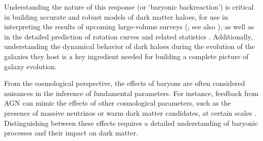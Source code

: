 Understanding the nature of this response (or `baryonic backreaction') is critical in building accurate and robust models of dark matter haloes, for use in interpreting the results of upcoming large-volume surveys (\citealp{2015JCAP...12..049S,2018MNRAS.480.3962C,2021MNRAS.503.3596A}; see also \citealp{velliscig+14,hwvh15,mead+15}), as well as in the detailed prediction of rotation curves and related statistics \citep{2021MNRAS.507..632P,2022MNRAS.517..130P}. Additionally, understanding the dynamical behavior of dark haloes during the evolution of the galaxies they host is a key ingredient needed for building a complete picture of galaxy evolution.

From the cosmological perspective, the effects of baryons are often considered nuisances in the inference of fundamental parameters. For instance, feedback from AGN can mimic the effects of other cosmological parameters, such as the presence of massive neutrinos or warm dark matter candidates, at certain scales \citep{2019Chisari_etal_Baryfeedback,2020AricoAnguloetal_baryonifi}. Distinguishing between these effects requires a detailed understanding of baryonic processes and their impact on dark matter.










